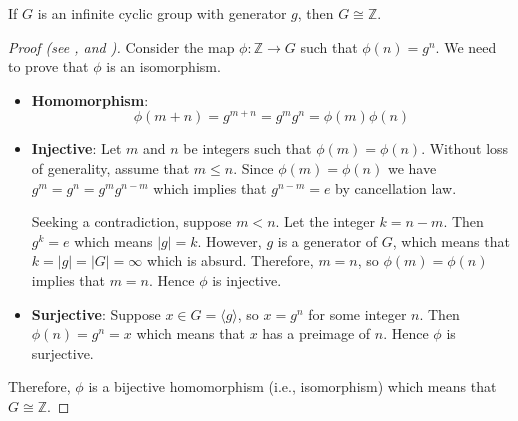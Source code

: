 \begin{theorem}
    If $G$ is an infinite cyclic group with generator $g$, then $G \cong \mathbb{Z}$.
\end{theorem}
\begin{proof}[Proof (see \cite{proofwiki_infinitecyclicgrp}, and {\cite[\S 3.4 Theorem 1]{cohn_1982}})]
    Consider the map $\phi: \mathbb{Z} \to G$ such that $\phi(n) = g^n$. We need to prove that $\phi$ is an isomorphism.
    \begin{itemize}
        \item \textbf{Homomorphism}:
        \[
            \phi(m+n) = g^{m+n} = g^mg^n = \phi(m)\phi(n)
        \]

        \item \textbf{Injective}: Let $m$ and $n$ be integers such that $\phi(m) = \phi(n)$. Without loss of generality, assume that $m \leq n$. Since $\phi(m) = \phi(n)$ we have $g^m = g^n = g^mg^{n-m}$ which implies that $g^{n-m} = e$ by cancellation law.

        Seeking a contradiction, suppose $m < n$. Let the integer $k = n - m$. Then $g^k = e$ which means $|g| = k$. However, $g$ is a generator of $G$, which means that $k = |g| = |G| = \infty$ which is absurd. Therefore, $m = n$, so $\phi(m) = \phi(n)$ implies that $m = n$. Hence $\phi$ is injective.

        \item \textbf{Surjective}: Suppose $x \in G = \langle g\rangle$, so $x = g^n$ for some integer $n$. Then $\phi(n) = g^n = x$ which means that $x$ has a preimage of $n$. Hence $\phi$ is surjective.
    \end{itemize}

    Therefore, $\phi$ is a bijective homomorphism (i.e., isomorphism) which means that $G \cong \mathbb{Z}$.
\end{proof}

